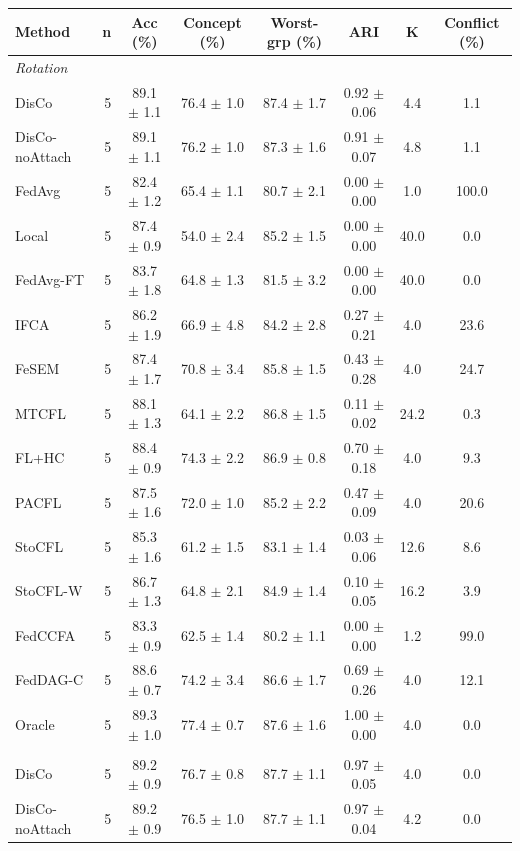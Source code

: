 {\scriptsize
\begin{tabular}{l r c c c c c c}
\toprule
Method & n & Acc (\%) & Concept (\%) & Worst-grp (\%) & ARI & K & Conflict (\%) \\
\midrule
\multicolumn{8}{l}{\textit{Rotation}} \\
DisCo & 5 & 89.1 $\pm$ 1.1 & 76.4 $\pm$ 1.0 & 87.4 $\pm$ 1.7 & 0.92 $\pm$ 0.06 & 4.4 & 1.1 \\
DisCo-noAttach & 5 & 89.1 $\pm$ 1.1 & 76.2 $\pm$ 1.0 & 87.3 $\pm$ 1.6 & 0.91 $\pm$ 0.07 & 4.8 & 1.1 \\
FedAvg & 5 & 82.4 $\pm$ 1.2 & 65.4 $\pm$ 1.1 & 80.7 $\pm$ 2.1 & 0.00 $\pm$ 0.00 & 1.0 & 100.0 \\
Local & 5 & 87.4 $\pm$ 0.9 & 54.0 $\pm$ 2.4 & 85.2 $\pm$ 1.5 & 0.00 $\pm$ 0.00 & 40.0 & 0.0 \\
FedAvg-FT & 5 & 83.7 $\pm$ 1.8 & 64.8 $\pm$ 1.3 & 81.5 $\pm$ 3.2 & 0.00 $\pm$ 0.00 & 40.0 & 0.0 \\
IFCA & 5 & 86.2 $\pm$ 1.9 & 66.9 $\pm$ 4.8 & 84.2 $\pm$ 2.8 & 0.27 $\pm$ 0.21 & 4.0 & 23.6 \\
FeSEM & 5 & 87.4 $\pm$ 1.7 & 70.8 $\pm$ 3.4 & 85.8 $\pm$ 1.5 & 0.43 $\pm$ 0.28 & 4.0 & 24.7 \\
MTCFL & 5 & 88.1 $\pm$ 1.3 & 64.1 $\pm$ 2.2 & 86.8 $\pm$ 1.5 & 0.11 $\pm$ 0.02 & 24.2 & 0.3 \\
FL+HC & 5 & 88.4 $\pm$ 0.9 & 74.3 $\pm$ 2.2 & 86.9 $\pm$ 0.8 & 0.70 $\pm$ 0.18 & 4.0 & 9.3 \\
PACFL & 5 & 87.5 $\pm$ 1.6 & 72.0 $\pm$ 1.0 & 85.2 $\pm$ 2.2 & 0.47 $\pm$ 0.09 & 4.0 & 20.6 \\
StoCFL & 5 & 85.3 $\pm$ 1.6 & 61.2 $\pm$ 1.5 & 83.1 $\pm$ 1.4 & 0.03 $\pm$ 0.06 & 12.6 & 8.6 \\
StoCFL-W & 5 & 86.7 $\pm$ 1.3 & 64.8 $\pm$ 2.1 & 84.9 $\pm$ 1.4 & 0.10 $\pm$ 0.05 & 16.2 & 3.9 \\
FedCCFA & 5 & 83.3 $\pm$ 0.9 & 62.5 $\pm$ 1.4 & 80.2 $\pm$ 1.1 & 0.00 $\pm$ 0.00 & 1.2 & 99.0 \\
FedDAG-C & 5 & 88.6 $\pm$ 0.7 & 74.2 $\pm$ 3.4 & 86.6 $\pm$ 1.7 & 0.69 $\pm$ 0.26 & 4.0 & 12.1 \\
Oracle & 5 & 89.3 $\pm$ 1.0 & 77.4 $\pm$ 0.7 & 87.6 $\pm$ 1.6 & 1.00 $\pm$ 0.00 & 4.0 & 0.0 \\
\addlinespace
\multicolumn{8}{l}{\textit{Label swap}} \\
DisCo & 5 & 89.2 $\pm$ 0.9 & 76.7 $\pm$ 0.8 & 87.7 $\pm$ 1.1 & 0.97 $\pm$ 0.05 & 4.0 & 0.0 \\
DisCo-noAttach & 5 & 89.2 $\pm$ 0.9 & 76.5 $\pm$ 1.0 & 87.7 $\pm$ 1.1 & 0.97 $\pm$ 0.04 & 4.2 & 0.0 \\

\end{tabular}}
